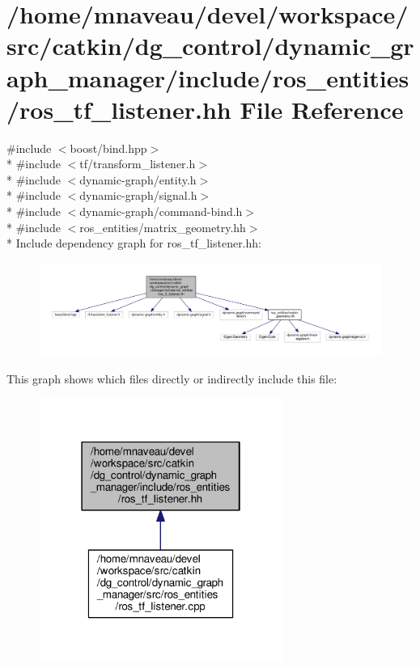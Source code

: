 \hypertarget{ros__tf__listener_8hh}{}\section{/home/mnaveau/devel/workspace/src/catkin/dg\+\_\+control/dynamic\+\_\+graph\+\_\+manager/include/ros\+\_\+entities/ros\+\_\+tf\+\_\+listener.hh File Reference}
\label{ros__tf__listener_8hh}
{\ttfamily \#include $<$boost/bind.\+hpp$>$}\\*
{\ttfamily \#include $<$tf/transform\+\_\+listener.\+h$>$}\\*
{\ttfamily \#include $<$dynamic-\/graph/entity.\+h$>$}\\*
{\ttfamily \#include $<$dynamic-\/graph/signal.\+h$>$}\\*
{\ttfamily \#include $<$dynamic-\/graph/command-\/bind.\+h$>$}\\*
{\ttfamily \#include $<$ros\+\_\+entities/matrix\+\_\+geometry.\+hh$>$}\\*
Include dependency graph for ros\+\_\+tf\+\_\+listener.\+hh\+:\nopagebreak
\begin{figure}[H]
\begin{center}
\leavevmode
\includegraphics[width=350pt]{ros__tf__listener_8hh__incl}
\end{center}
\end{figure}
This graph shows which files directly or indirectly include this file\+:\nopagebreak
\begin{figure}[H]
\begin{center}
\leavevmode
\includegraphics[width=226pt]{ros__tf__listener_8hh__dep__incl}
\end{center}
\end{figure}
